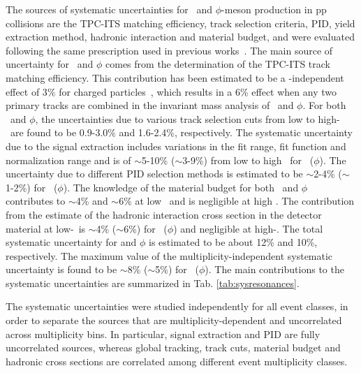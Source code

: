 The sources of systematic uncertainties for \kstar\ and $\phi$-meson production in pp collisions 
are the TPC-ITS matching efficiency, track selection criteria, PID, yield extraction method, hadronic 
interaction and material budget, and were evaluated following the same prescription used in previous 
works~\cite{Adam:2016bpr, Abelev:2012hy}. 
The main source of uncertainty for \kstar\ and $\phi$ comes from 
the determination of the TPC-ITS track matching efficiency. This contribution has been estimated 
to be a \pt-independent effect of 3$\%$ for charged particles~\cite{id2208submitted}, which 
results in a 6\% effect when 
any two primary tracks are combined in the invariant mass analysis of \kstar\ and $\phi$. For both \kstar\ 
and $\phi$, the uncertainties due to various track selection cuts from low to high-\pt\ are found 
to be 0.9-3.0\% and 1.6-2.4\%, respectively. The systematic uncertainty due to the signal extraction 
 includes variations in the fit range, fit function and normalization range and is of $\sim$5-10\% 
($\sim$3-9\%) from low to high \pt\ for \kstar\ ($\phi$). The uncertainty due to different PID selection methods
is estimated to be $\sim$2-4\% ($\sim$1-2$\%$) for  \kstar\ ($\phi$). The knowledge of the material budget 
for both \kstar\ and $\phi$ contributes to $\sim$4\% and $\sim$6\% at low \pt\ and is negligible at high \pt. 
The contribution from the estimate of the hadronic interaction cross section in the 
detector material at low-\pt\ is $\sim$4\% ($\sim$6\%) for \kstar\ ($\phi$) and negligible at high-\pt. The 
total systematic uncertainty for \kstar and $\phi$ is estimated to be about 12\% and 10\%, 
respectively. The maximum value of the multiplicity-independent systematic uncertainty is found 
to be $\sim$8\% ($\sim$5\%) for \kstar\ ($\phi$). The main contributions to the systematic 
uncertainties are summarized in Tab. \ref{tab:sysresonances}.
    
The systematic uncertainties were studied independently for all event classes, in order to separate the sources 
that are multiplicity-dependent and uncorrelated across multiplicity bins. In particular, signal 
extraction and PID are fully uncorrelated sources, whereas global tracking, track cuts, material 
budget and hadronic cross sections are correlated among different event multiplicity classes.


